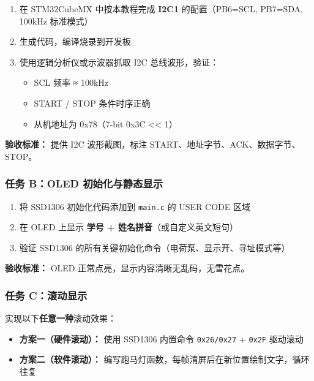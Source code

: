 \documentclass[
  chinese,
  UTF8,
  oneside,
  openany]{ctexbook}
\providecommand{\tightlist}{%
  \setlength{\itemsep}{0pt}\setlength{\parskip}{0pt}}
\begin{document}
\begin{enumerate}
\def\labelenumi{\arabic{enumi}.}
\tightlist
\item
  在 STM32CubeMX 中按本教程完成 \textbf{I2C1} 的配置（PB6=SCL, PB7=SDA,
  100kHz 标准模式）
\item
  生成代码，编译烧录到开发板
\item
  使用逻辑分析仪或示波器抓取 I2C 总线波形，验证：

  \begin{itemize}
  \tightlist
  \item
    SCL 频率 ≈ 100kHz
  \item
    START / STOP 条件时序正确
  \item
    从机地址为 0x78（7-bit 0x3C \textless\textless{} 1）
  \end{itemize}
\end{enumerate}

\textbf{验收标准：} 提供 I2C 波形截图，标注
START、地址字节、ACK、数据字节、STOP。

\subsubsection{任务 B：OLED
初始化与静态显示}\label{ux4efbux52a1-boled-ux521dux59cbux5316ux4e0eux9759ux6001ux663eux793a}

\begin{enumerate}
\def\labelenumi{\arabic{enumi}.}
\tightlist
\item
  将 SSD1306 初始化代码添加到 \texttt{main.c} 的 USER CODE 区域
\item
  在 OLED 上显示 \textbf{学号 + 姓名拼音}（或自定义英文短句）
\item
  验证 SSD1306 的所有关键初始化命令（电荷泵、显示开、寻址模式等）
\end{enumerate}

\textbf{验收标准：} OLED 正常点亮，显示内容清晰无乱码，无雪花点。

\subsubsection{任务
C：滚动显示}\label{ux4efbux52a1-cux6edaux52a8ux663eux793a}

实现以下\textbf{任意一种}滚动效果：

\begin{itemize}
\tightlist
\item
  \textbf{方案一（硬件滚动）：} 使用 SSD1306 内置命令 \texttt{0x26/0x27}
  + \texttt{0x2F} 驱动滚动
\item
  \textbf{方案二（软件滚动）：}
  编写跑马灯函数，每帧清屏后在新位置绘制文字，循环往复
\end{itemize}
\end{document}
